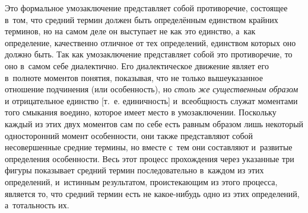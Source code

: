 Это формальное умозаключение представляет собой противоречие,
состоящее в~том, что средний термин должен быть определённым
единством крайних терминов, но на самом деле он выступает не
как это единство, а~как определение, качественно отличное от тех
определений, единством которых оно должно быть. Так как умозаключение
представляет собой это противоречие, то оно в~самом себе диалектично. Его
диалектическое движение являет его в~полноте моментов понятия, показывая,
что не только вышеуказанное отношение подчинения (или особенность), но
{\em столь же существенным образом}
и отрицательное единство [т.~е. единичность] и~всеобщность
служат моментами того смыкания воедино, которое имеет место в
умозаключении. Поскольку каждый из этих двух моментов сам по себе есть
равным образом лишь некоторый односторонний момент особенности, они также
представляют собой несовершенные средние термины, но вместе с~тем они
составляют и~развитые определения особенности. Весь этот процесс
прохождения через указанные три фигуры показывает средний термин
последовательно в~каждом из этих определений, и~истинным результатом,
проистекающим из этого процесса, является то, что средний термин есть не
какое-нибудь одно из этих определений, а~тотальность их.

